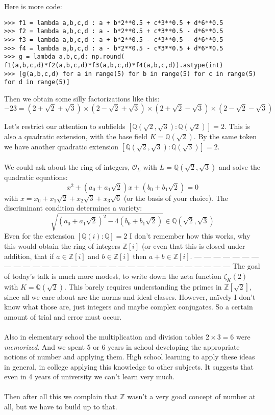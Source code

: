 \documentclass[12pt]{article}
\begin{document}
Here is more code:
\begin{verbatim}
>>> f1 = lambda a,b,c,d : a + b*2**0.5 + c*3**0.5 + d*6**0.5
>>> f2 = lambda a,b,c,d : a - b*2**0.5 + c*3**0.5 - d*6**0.5
>>> f3 = lambda a,b,c,d : a + b*2**0.5 - c*3**0.5 - d*6**0.5
>>> f4 = lambda a,b,c,d : a - b*2**0.5 - c*3**0.5 + d*6**0.5
>>> g = lambda a,b,c,d: np.round( f1(a,b,c,d)*f2(a,b,c,d)*f3(a,b,c,d)*f4(a,b,c,d)).astype(int)
>>> [g(a,b,c,d) for a in range(5) for b in range(5) for c in range(5) for d in range(5)]

\end{verbatim}
Then we obtain some silly factorizations like this:
$$-23 = 
(2 + \sqrt{2}+\sqrt{3})\times
(2 - \sqrt{2}+\sqrt{3})\times
(2 + \sqrt{2}-\sqrt{3})\times
(2 - \sqrt{2}-\sqrt{3}) $$
\newpage

\noindent Let's restrict our attention to subfields 
$[\mathbb{Q}(\sqrt{2},\sqrt{3}):\mathbb{Q}(\sqrt{2})]=2$.  This is also a quadratic extension, with the base field $K = \mathbb{Q}(\sqrt{2})$.  By the same token we have another quadratic extension $[\mathbb{Q}(\sqrt{2},\sqrt{3}):\mathbb{Q}(\sqrt{3})]=2$. \\ \\
We could ask about the ring of integers, $\mathcal{O}_L$ with $L = \mathbb{Q}(\sqrt{2}, \sqrt{3})$ and solve the quadratic equations:
$$ x^2 + (a_0 + a_1 \sqrt{2})x + (b_0 + b_1 \sqrt{2}) = 0 $$
with $x = x_0 + x_1 \sqrt{2} + x_2 \sqrt{3} + x_3 \sqrt{6}$ (or the basis of your choice).  The discriminant condition determines a variety:
$$ 
\sqrt{(a_0 + a_1 \sqrt{2})^2 - 4 (b_0 + b_1 \sqrt{2}) }
\in \mathbb{Q}(\sqrt{2}, \sqrt{3})$$
Even for the extension $[\mathbb{Q}(i):\mathbb{Q}] = 2$ I don't remember how this works, why this would obtain the ring of integers $\mathbb{Z}[i]$ (or even that this is closed under addition, that if $a \in \mathbb{Z}[i]$ and $b \in \mathbb{Z}[i]$ then $a+b \in \mathbb{Z}[i]$. 
\newline \newline
--- --- --- --- --- --- --- --- 
--- --- --- --- --- --- --- --- 
--- --- --- --- --- --- --- --- 
--- --- --- --- --- --- ---
\newline \newline
The goal of today's talk is much more modest, to write down the zeta function $\zeta_K(2)$ with $K = \mathbb{Q}(\sqrt{2})$.  This barely requires understanding the primes in $\mathbb{Z}[\sqrt{2}]$, since all we care about are the norms and ideal classes.  However, na\"{i}vely I don't know what those are, just integers and maybe complex conjugates.  So a certain amount of trial and error must occur. \\ \\
Also in elementary school the multiplication and division tables $2 \times 3 = 6$ were \textit{memorized}.  And we spent 5 or 6 years in school developing the appropriate notions of number and applying them.  High school learning to apply these ideas in general, in college applying this knowledge to other subjects.  It suggests that even in 4 years of university we can't learn very much. \\ \\
Then after all this we complain that $\mathbb{Z}$ wasn't a very good concept of number at all, but we have to build up to that.
\end{document}
